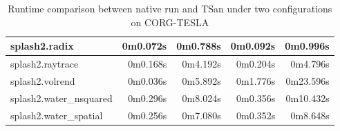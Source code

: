 \begin{table}[htbp]
\begin{tabular}{|l|r|r|r|r|}
splash2.radix	&	0m0.072s	&	0m0.788s	&	0m0.092s	&	0m0.996s	\\	\hline
splash2.raytrace	&	0m0.168s	&	0m4.192s	&	0m0.204s	&	0m4.796s	\\	\hline
splash2.volrend	&	0m0.036s	&	0m5.892s	&	0m1.776s	&	0m23.596s	\\	\hline
splash2.water\_nsquared	&	0m0.296s	&	0m8.024s	&	0m0.356s	&	0m10.432s	\\	\hline
splash2.water\_spatial	&	0m0.256s	&	0m7.080s	&	0m0.352s	&	0m8.648s	\\	\hline
\end{tabular}
\caption{Runtime comparison between native run and TSan under two configurations on CORG-TESLA}
\end{table}




\begin{table}[htbp]
\centering
{}
\end{table}
